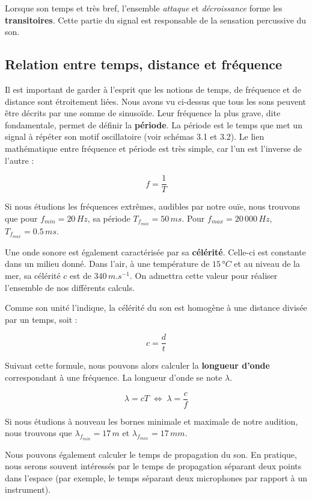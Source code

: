 \documentclass[
]{book}
\begin{document}
Lorsque son temps et très bref, l'ensemble \emph{attaque} et \emph{décroissance} forme les \textbf{transitoires}. Cette partie du signal est responsable de la sensation percussive du son.

\hypertarget{relation-entre-temps-distance-et-fruxe9quence}{%
\subsection{Relation entre temps, distance et fréquence}\label{relation-entre-temps-distance-et-fruxe9quence}}

Il est important de garder à l'esprit que les notions de temps, de fréquence et de distance sont étroitement liées. Nous avons vu ci-dessus que tous les sons peuvent être décrits par une somme de sinusoïde. Leur fréquence la plus grave, dite fondamentale, permet de définir la \textbf{période}. La période est le temps que met un signal à répéter son motif oscillatoire (voir schémas 3.1 et 3.2). Le lien mathématique entre fréquence et période est très simple, car l'un est l'inverse de l'autre :

\[ f = \frac 1 T \]

Si nous étudions les fréquences extrêmes, audibles par notre ouïe, nous trouvons que pour \(f_{min} = 20 \,Hz\), sa période \(T_{f_{min}} = 50 \,ms\). Pour \(f_{max} = 20\,000 \,Hz\), \(T_{f_{max}} = 0.5 \,ms\).

Une onde sonore est également caractérisée par sa \textbf{célérité}. Celle-ci est constante dans un milieu donné. Dans l'air, à une température de \(15 \,°C\) et au niveau de la mer, sa célérité \(c\) est de \(340\,m.s^{-1}\). On admettra cette valeur pour réaliser l'ensemble de nos différents calculs.

Comme son unité l'indique, la célérité du son est homogène à une distance divisée par un temps, soit :

\[ c =\frac d t \]

Suivant cette formule, nous pouvons alors calculer la \textbf{longueur d'onde} correspondant à une fréquence. La longueur d'onde se note \(\lambda\).

\[ \lambda = cT \; \iff \; \lambda = \frac c f\]

Si nous étudions à nouveau les bornes minimale et maximale de notre audition, nous trouvons que \(\lambda_{f_{min}} = 17 \,m\) et \(\lambda_{f_{max}} = 17 \,mm\).

Nous pouvons également calculer le temps de propagation du son. En pratique, nous serons souvent intéressés par le temps de propagation séparant deux points dans l'espace (par exemple, le temps séparant deux microphones par rapport à un instrument).
\end{document}
